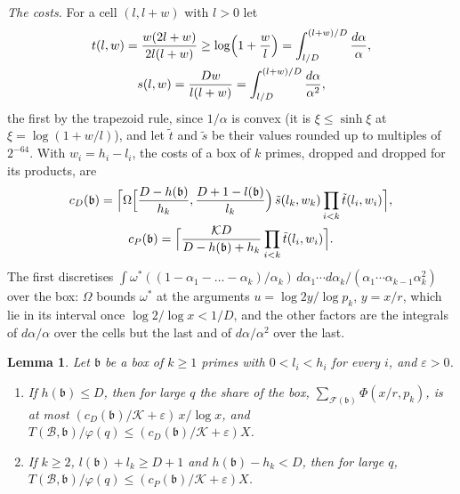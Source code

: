 \documentclass[11pt]{article}
\newtheorem{lemma}[theorem]{Lemma}
\theoremstyle{definition}
\begin{document}
\emph{The costs.} For a cell $(l, l + w)$ with $l > 0$ let
\begin{gather*}
  t(l, w) = \frac{w(2l + w)}{2l(l + w)} \ge \log\Bigl(1 + \frac wl\Bigr) = \int_{l/D}^{(l + w)/D} \frac{d\alpha}\alpha,
  \\
  s(l, w) = \frac{Dw}{l(l + w)} = \int_{l/D}^{(l + w)/D} \frac{d\alpha}{\alpha^2},
\end{gather*}
the first by the trapezoid rule, since $1/\alpha$ is convex (it is $\xi \le \sinh \xi$ at $\xi = \log(1 + w/l)$), and
let
$\tilde t$ and $\tilde s$ be their values rounded up to multiples of $2^{-64}$. With $w_i = h_i - l_i$, the costs of a
box of $k$ primes, dropped and dropped for its products, are
\begin{equation}\label{eq:cD}
\begin{gathered}
  c_D(\mathfrak b) = \Bigl\lceil \Omega\Bigl[\frac{D - h(\mathfrak b)}{h_k}, \frac{D + 1 - l(\mathfrak b)}{l_k}\Bigr)\,
  \tilde s(l_k, w_k) \prod_{i < k} \tilde t(l_i, w_i) \Bigr\rceil, \\
  c_P(\mathfrak b) = \Bigl\lceil \frac{\mathcal K D}{D - h(\mathfrak b) + h_k} \prod_{i < k} \tilde t(l_i, w_i)
  \Bigr\rceil.
\end{gathered}
\end{equation}
The first discretises $\int \omega^*((1 - \alpha_1 - \dots - \alpha_k)/\alpha_k)\, d\alpha_1 \cdots
d\alpha_k/(\alpha_1 \cdots \alpha_{k - 1} \alpha_k^2)$ over the box: $\Omega$ bounds $\omega^*$ at the arguments $u =
\log 2y/\log p_k$, $y = x/r$, which lie in its interval once $\log 2/\log x < 1/D$, and the other factors are the
integrals of
$d\alpha/\alpha$ over the cells but the last and of $d\alpha/\alpha^2$ over the last.

\begin{lemma}\label{lem:drop}
Let $\mathfrak b$ be a box of $k \ge 1$ primes with $0 < l_i < h_i$ for every $i$, and $\varepsilon > 0$.
\begin{enumerate}
\item If $h(\mathfrak b) \le D$, then for large $q$ the \emph{share} of the box, $\sum_{\mathcal F(\mathfrak b)}
\Phi(x/r,
  p_k)$, is at most $(c_D(\mathfrak b)/\mathcal K + \varepsilon)\, x/\log x$, and $T(\mathcal B, \mathfrak b)/\varphi(q)
  \le (c_D(\mathfrak b)/\mathcal K + \varepsilon) X$.
\item If $k \ge 2$, $l(\mathfrak b) + l_k \ge D + 1$ and $h(\mathfrak b) - h_k < D$, then for large $q$, $T(\mathcal B,
  \mathfrak b)/\varphi(q) \le (c_P(\mathfrak b)/\mathcal K + \varepsilon) X$.
\end{enumerate}
\end{lemma}
\end{document}

